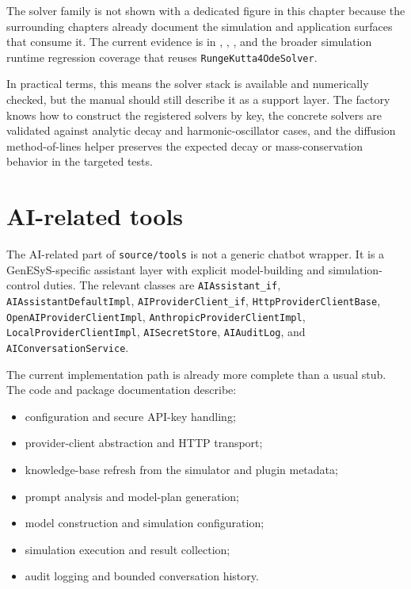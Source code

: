 The solver family is not shown with a dedicated figure in this chapter because the surrounding chapters already document the simulation and application surfaces that consume it. The current evidence is in , , , and the broader simulation runtime regression coverage that reuses \texttt{RungeKutta4OdeSolver}.

In practical terms, this means the solver stack is available and numerically checked, but the manual should still describe it as a support layer. The factory knows how to construct the registered solvers by key, the concrete solvers are validated against analytic decay and harmonic-oscillator cases, and the diffusion method-of-lines helper preserves the expected decay or mass-conservation behavior in the targeted tests.

\section{AI-related tools}
\label{sec:tools-ai-related}

The AI-related part of \texttt{source/tools} is not a generic chatbot wrapper. It is a GenESyS-specific assistant layer with explicit model-building and simulation-control duties. The relevant classes are \texttt{AIAssistant\_if}, \texttt{AIAssistantDefaultImpl}, \texttt{AIProviderClient\_if}, \texttt{HttpProviderClientBase}, \texttt{OpenAIProviderClientImpl}, \texttt{AnthropicProviderClientImpl}, \texttt{LocalProviderClientImpl}, \texttt{AISecretStore}, \texttt{AIAuditLog}, and \texttt{AIConversationService}.

The current implementation path is already more complete than a usual stub. The code and package documentation describe:
\begin{itemize}
\item configuration and secure API-key handling;
\item provider-client abstraction and HTTP transport;
\item knowledge-base refresh from the simulator and plugin metadata;
\item prompt analysis and model-plan generation;
\item model construction and simulation configuration;
\item simulation execution and result collection;
\item audit logging and bounded conversation history.
\end{itemize}

